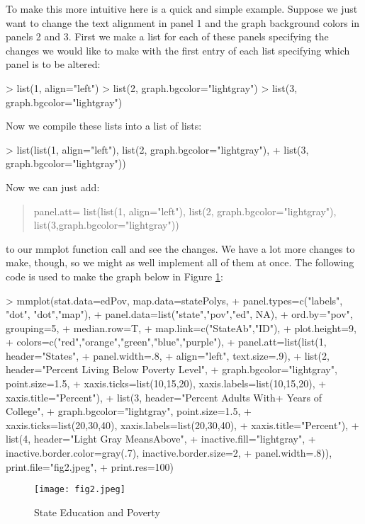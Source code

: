 \documentclass{article}
\begin{document}
To make this more intuitive here is a quick and simple example. Suppose we just want to change the text alignment in panel 1 and the graph background colors in panels 2 and 3. First we make a list for each of these panels specifying the changes we would like to make with the first entry of each list specifying which panel is to be altered:
\begin{Schunk}
\begin{Sinput}
> list(1, align="left")
> list(2, graph.bgcolor="lightgray")
> list(3, graph.bgcolor="lightgray")
\end{Sinput}
\end{Schunk}
Now we compile these lists into a list of lists:
\begin{Schunk}
\begin{Sinput}
> list(list(1, align="left"), list(2, graph.bgcolor="lightgray"), 
+      list(3, graph.bgcolor="lightgray"))
\end{Sinput}
\end{Schunk}

Now we can just add: 
\noindent\begin{quote}panel.att= list(list(1, align="left"), list(2, graph.bgcolor="lightgray"), list(3,graph.bgcolor="lightgray"))\end{quote} 
to our mmplot function call and see the changes. We have a lot more changes to
make, though, so we might as well implement all of them at once. The following code is used to make the graph below in Figure \ref{fig2}:

\begin{Schunk}
\begin{Sinput}
> mmplot(stat.data=edPov, map.data=statePolys,
+ panel.types=c("labels", "dot", "dot","map"),
+ panel.data=list("state","pov","ed", NA),
+ ord.by="pov", grouping=5,
+ median.row=T,
+ map.link=c("StateAb","ID"),
+ plot.height=9,
+ colors=c("red","orange","green","blue","purple"),
+ panel.att=list(list(1, header="States",
+ panel.width=.8, 
+ align="left", text.size=.9),
+ list(2, header="Percent Living Below \n Poverty Level",
+ graph.bgcolor="lightgray", point.size=1.5,
+ xaxis.ticks=list(10,15,20), xaxis.labels=list(10,15,20),
+ xaxis.title="Percent"),
+ list(3, header="Percent Adults With+ Years of College",
+ graph.bgcolor="lightgray", point.size=1.5,
+ xaxis.ticks=list(20,30,40), xaxis.labels=list(20,30,40),
+ xaxis.title="Percent"),
+ list(4, header="Light Gray Means\nHighlighted Above",
+ inactive.fill="lightgray",
+ inactive.border.color=gray(.7), inactive.border.size=2,
+ panel.width=.8)), print.file="fig2.jpeg", 
+ print.res=100) 
\end{Sinput}
\end{Schunk}
\begin{figure}
\begin{center}
\texttt{[image: fig2.jpeg]} 
  \caption{State Education and Poverty} 
\label{fig2}
\end{center}
\end{figure}
\end{document}
